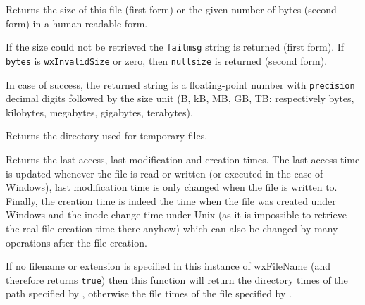 \label{wxfilenamegethumanreadablesize}



Returns the size of this file (first form) or the given number of bytes (second form)
in a human-readable form.

If the size could not be retrieved the {\tt failmsg} string is returned (first form).
If {\tt bytes} is {\tt wxInvalidSize} or zero, then {\tt nullsize} is returned (second form).

In case of success, the returned string is a floating-point number with {\tt precision} decimal digits
followed by the size unit (B, kB, MB, GB, TB: respectively bytes, kilobytes, megabytes, gigabytes, terabytes).


\label{wxfilenamegettempdir}


Returns the directory used for temporary files.


\label{wxfilenamegettimes}


Returns the last access, last modification and creation times. The last access
time is updated whenever the file is read or written (or executed in the case
of Windows), last modification time is only changed when the file is written
to. Finally, the creation time is indeed the time when the file was created
under Windows and the inode change time under Unix (as it is impossible to
retrieve the real file creation time there anyhow) which can also be changed
by many operations after the file creation.

If no filename or extension is specified in this instance of wxFileName
(and therefore  returns {\tt true}) then
this function will return the directory times of the path specified by
, otherwise the file times of the
file specified by .


